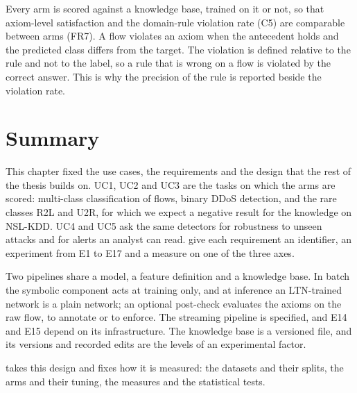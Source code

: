 Every arm is scored against a knowledge base, trained on it or not, so that
axiom-level satisfaction and the domain-rule violation rate (C5) are comparable
between arms (FR7). A flow violates an axiom when the antecedent holds and the
predicted class differs from the target. The violation is defined relative to the
rule and not to the label, so a rule that is wrong on a flow is violated by the
correct answer. This is why the precision of the rule is reported beside the
violation rate.

\section{Summary}
\label{sec:ch7-summary}

This chapter fixed the use cases, the requirements and the design that the rest of
the thesis builds on. UC1, UC2 and UC3 are the tasks on which the arms are scored:
multi-class classification of flows, binary DDoS detection, and the rare classes
R2L and U2R, for which we expect a negative result for the knowledge on NSL-KDD.
UC4 and UC5 ask the same detectors for robustness to unseen attacks and for
alerts an analyst can read. 
give each requirement an identifier, an experiment from E1 to E17 and a measure on
one of the three axes.

Two pipelines share a model, a feature definition and a knowledge base. In batch
the symbolic component acts at training only, and at inference an LTN-trained
network is a plain network; an optional post-check evaluates the axioms on the raw
flow, to annotate or to enforce. The streaming pipeline is specified, and E14 and E15
depend on its infrastructure. The knowledge base is a
versioned file, and its versions and recorded edits are the levels of an
experimental factor.

 takes this design and fixes how it is
measured: the datasets and their splits, the arms and their tuning, the measures
and the statistical tests.
